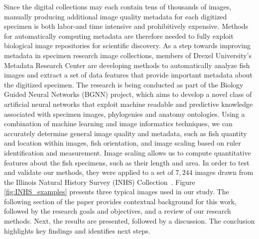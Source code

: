 \documentclass[conference]{IEEEtran}
\begin{document}
Since the digital collections may each contain tens of thousands of images, manually producing additional image quality metadata for each digitized specimen is both labor-and time intensive and prohibitively expensive. Methods for automatically computing metadata are therefore needed to fully exploit biological image repositories for scientific discovery.
As a step towards improving metadata in specimen research image collections, members of Drexel University's Metadata Research Center are developing methods to automatically analyze fish images and
extract a set of data features that provide important metadata about the
digitized specimen.
The research is being conducted as part of the Biology Guided Neural Networks (BGNN) project, which aims to develop a novel class of artificial neural networks that exploit machine readable and predictive knowledge associated with specimen images, phylogenies and anatomy ontologies.
Using a combination of machine learning and image informatics 
techniques,
we can accurately determine general image quality and metadata, such as fish quantity and location within images, fish orientation, and
image scaling based on ruler identification and measurement. Image scaling
allows us to compute quantitative features about the fish specimens, such
as their length and area.  In order to test and validate our methods, they
were  applied to a set of \(7,244\)
images drawn from the Illinois Natural History Survey (INHS) Collection~\cite{INHS}.
Figure \ref{fig:INHS_examples} presents three typical images used in our
study.
The following section of the paper provides contextual background for this work, followed by the research goals and objectives, and a review of our research methods. Next, the results are presented, followed by a discussion. The conclusion highlights key findings and identifies next steps.
\end{document}
